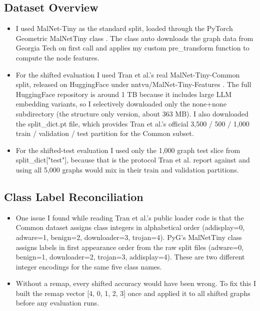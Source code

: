 \documentclass[12pt]{article}
\begin{document}
\subsection{Dataset Overview}

\begin{itemize}
    \item I used MalNet-Tiny as the standard split, loaded through the PyTorch Geometric MalNetTiny class \cite{fey2019pyg}. The class auto downloads the graph data from Georgia Tech on first call and applies my custom pre\_transform function to compute the node features.
    \item For the shifted evaluation I used Tran et al.'s real MalNet-Tiny-Common split, released on HuggingFace under nntvu/MalNet-Tiny-Features \cite{nntvuhf}. The full HuggingFace repository is around 1 TB because it includes large LLM embedding variants, so I selectively downloaded only the none+none subdirectory (the structure only version, about 363 MB). I also downloaded the split\_dict.pt file, which provides Tran et al.'s official 3,500 / 500 / 1,000 train / validation / test partition for the Common subset.
    \item For the shifted-test evaluation I used only the 1,000 graph test slice from split\_dict["test"], because that is the protocol Tran et al. report against and using all 5,000 graphs would mix in their train and validation partitions.
\end{itemize}

\subsection{Class Label Reconciliation}

\begin{itemize}
    \item One issue I found while reading Tran et al.'s public loader code is that the Common dataset assigns class integers in alphabetical order (addisplay=0, adware=1, benign=2, downloader=3, trojan=4). PyG's MalNetTiny class assigns labels in first appearance order from the raw split files (adware=0, benign=1, downloader=2, trojan=3, addisplay=4). These are two different integer encodings for the same five class names.
    \item Without a remap, every shifted accuracy would have been wrong. To fix this I built the remap vector [4, 0, 1, 2, 3] once and applied it to all shifted graphs before any evaluation runs.
\end{itemize}
\end{document}
